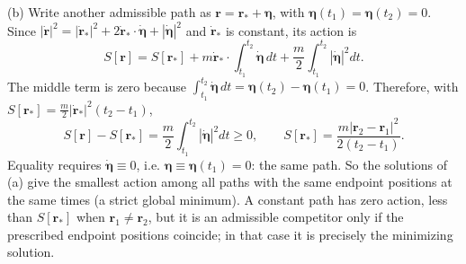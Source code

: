 (b) Write another admissible path as
$\mathbf r=\mathbf r_*+\boldsymbol\eta$, with
$\boldsymbol\eta(t_1)=\boldsymbol\eta(t_2)=0$. Since
$|\dot{\mathbf r}|^2=|\dot{\mathbf r}_*|^2
+2\dot{\mathbf r}_*\cdot\dot{\boldsymbol\eta}
+|\dot{\boldsymbol\eta}|^2$ and $\dot{\mathbf r}_*$ is constant,
its action is
\[
S[\mathbf r]=S[\mathbf r_*]
+m\dot{\mathbf r}_*\cdot\int_{t_1}^{t_2}\dot{\boldsymbol\eta}\,dt
+\frac m2\int_{t_1}^{t_2}|\dot{\boldsymbol\eta}|^2dt.
\]
The middle term is zero because
$\int_{t_1}^{t_2}\dot{\boldsymbol\eta}\,dt
=\boldsymbol\eta(t_2)-\boldsymbol\eta(t_1)=0$. Therefore, with
$S[\mathbf r_*]=\frac m2|\dot{\mathbf r}_*|^2(t_2-t_1)$,
\[
\boxed{S[\mathbf r]-S[\mathbf r_*]
=\frac m2\int_{t_1}^{t_2}|\dot{\boldsymbol\eta}|^2dt\ge0},
\qquad
S[\mathbf r_*]=\frac{m|\mathbf r_2-\mathbf r_1|^2}{2(t_2-t_1)}.
\]
Equality requires $\dot{\boldsymbol\eta}\equiv0$, i.e.
$\boldsymbol\eta\equiv\boldsymbol\eta(t_1)=0$: the same path. So the
solutions of (a) give the smallest action among all paths with the
same endpoint positions at the same times (a strict global minimum).
A constant path has zero action, less than $S[\mathbf r_*]$ when
$\mathbf r_1\ne\mathbf r_2$, but it is an admissible competitor only
if the prescribed endpoint positions coincide; in that case it is
precisely the minimizing solution.


